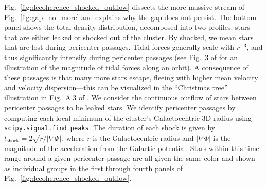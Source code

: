 \documentclass{aa}
\begin{document}
\begin{appendix}
    Fig.~\ref{fig:decoherence_shocked_outflow} dissects the more massive stream of Fig.~\ref{fig:gap_no_more} and explains why the gap does not persist. The bottom panel shows the total density distribution, decomposed into two profiles: stars that are either leaked or shocked out of the cluster. By shocked, we mean stars that are lost during pericenter passages. Tidal forces generally scale with $r^{-3}$, and thus significantly intensify during pericenter passages (see Fig.~3 of \citet{2004AJ....127.2753D} for an illustration of the magnitude of tidal forces along an orbit). A consequence of these passages is that many more stars escape, fleeing with higher mean velocity and velocity dispersion—this can be visualized in the ``Christmas tree'' illustration in Fig.~A.3 of \citet{2012A&A...546L...7M}. We consider the continuous outflow of stars between pericenter passages to be leaked stars. We identify pericenter passages by computing each local minimum of the cluster's Galactocentric 3D radius using \texttt{scipy.signal.find\_peaks}. The duration of each shock is given by $t_{\textrm{shock}} = 2\sqrt{r/|\nabla\Phi|}$, where $r$ is the Galactocentric radius and $|\nabla\Phi|$ is the magnitude of the acceleration from the Galactic potential. Stars within this time range around a given pericenter passage are all given the same color and shown as individual groups in the first through fourth panels of Fig.~\ref{fig:decoherence_shocked_outflow}.


\end{appendix}
\end{document}
